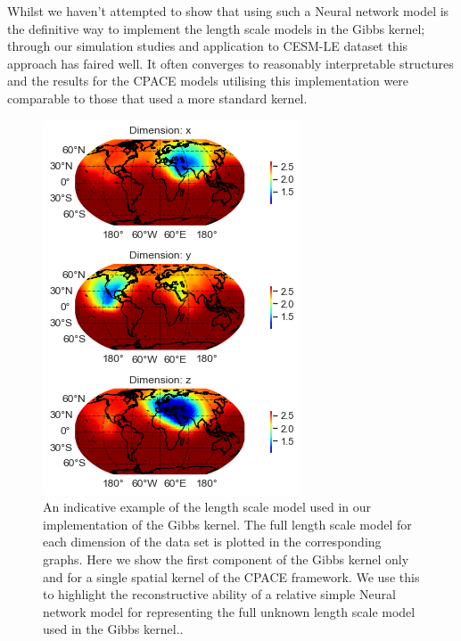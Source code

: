 Whilst we haven't attempted to show that using such a Neural network model is the definitive way to implement the length scale models in the Gibbs kernel; through our simulation studies and application to CESM-LE dataset this approach has faired well.
It often converges to reasonably interpretable structures and the results for the CPACE models utilising this implementation were comparable to those that used a more standard kernel.

\begin{figure}
	\centering
	\includegraphics[width=\textwidth]{gibbs_lengthscale}
	\caption{An indicative example of the length scale model used in our implementation of the Gibbs kernel. The full length scale model for each dimension of the data set is plotted in the corresponding graphs. Here we show the first component of the Gibbs kernel only and for a single spatial kernel of the CPACE framework. We use this to highlight the reconstructive ability of a relative simple Neural network model for representing the full unknown length scale model used in the Gibbs kernel..}
	\label{fig:gibbs_lengthscale}
\end{figure}